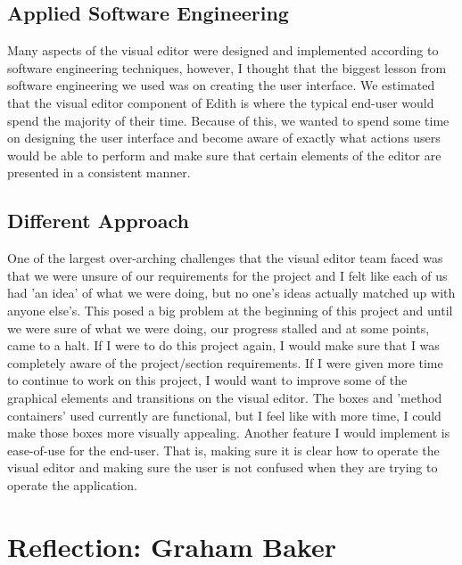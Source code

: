 \documentclass[a4paper]{article}
\begin{document}
\subsection{Applied Software Engineering}

Many aspects of the visual editor were designed and implemented according to software engineering techniques, however, I thought that the biggest lesson from software engineering we used was on creating the user interface. We estimated that the visual editor component of Edith is where the typical end-user would spend the majority of their time. Because of this, we wanted to spend some time on designing the user interface and become aware of exactly what actions users would be able to perform and make sure that certain elements of the editor are presented in a consistent manner.

\subsection{Different Approach}

One of the largest over-arching challenges that the visual editor team faced was that we were unsure of our requirements for the project and I felt like each of us had 'an idea' of what we were doing, but no one's ideas actually matched up with anyone else's. This posed a big problem at the beginning of this project and until we were sure of what we were doing, our progress stalled and at some points, came to a halt. If I were to do this project again, I would make sure that I was completely aware of the project/section requirements. If I were given more time to continue to work on this project, I would want to improve some of the graphical elements and transitions on the visual editor. The boxes and 'method containers' used currently are functional, but I feel like with more time, I could make those boxes more visually appealing. Another feature I would implement is ease-of-use for the end-user. That is, making sure it is clear how to operate the visual editor and making sure the user is not confused when they are trying to operate the application.


\section{Reflection: Graham Baker}
\end{document}
